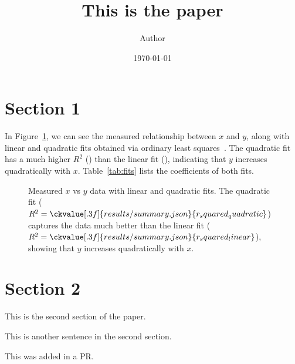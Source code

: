 \documentclass[11pt]{article}
\title{This is the paper}
\author{ Author }
\date{\today}
\begin{document}
\maketitle
\pagebreak



\section{Section 1}

In Figure~\ref{fig:x-vs-y},
we can see the measured relationship between $x$ and $y$,
along with linear and quadratic fits
obtained via ordinary least squares~\cite{draper1998applied}.
The quadratic fit has a much higher $R^2$
()
than the linear fit
(),
indicating that $y$ increases quadratically with $x$.
Table~\ref{tab:fits} lists the coefficients of both fits.

\begin{figure}[h]
  \centering
  \caption{
    Measured $x$ vs $y$ data with linear and quadratic fits.
    The quadratic fit
    ($R^2 = \ckvalue[.3f]{results/summary.json}{r_squared_quadratic}$)
    captures the data much better than the linear fit
    ($R^2 = \ckvalue[.3f]{results/summary.json}{r_squared_linear}$),
    showing that $y$ increases quadratically with $x$.
  }
  \label{fig:x-vs-y}
\end{figure}

\begin{table}[h]
  \centering
  \caption{
    Coefficients of the fits $y = a_2 x^2 + a_1 x + a_0$
    and their coefficients of determination.
  }
  \label{tab:fits}
\end{table}


\pagebreak
\section{Section 2}

This is the second section of the paper.

This is another sentence in the second section.

This was added in a PR.




\end{document}
